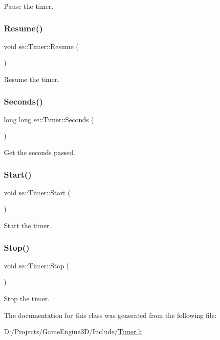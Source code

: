 Pause the timer. \mbox{\label{classse_1_1_timer_a432406f463e02336c1033d65ae1d746e}} 
\subsubsection{\texorpdfstring{Resume()}{Resume()}}
{\footnotesize\ttfamily void se\+::\+Timer\+::\+Resume (\begin{DoxyParamCaption}{ }\end{DoxyParamCaption})}

Resume the timer. \mbox{\label{classse_1_1_timer_a258761c48271338588503d8170532bde}} 
\subsubsection{\texorpdfstring{Seconds()}{Seconds()}}
{\footnotesize\ttfamily long long se\+::\+Timer\+::\+Seconds (\begin{DoxyParamCaption}{ }\end{DoxyParamCaption})}

Get the seconds passed. \mbox{\label{classse_1_1_timer_a0294f5629a28a1e169a8d1b5ab179273}} 
\subsubsection{\texorpdfstring{Start()}{Start()}}
{\footnotesize\ttfamily void se\+::\+Timer\+::\+Start (\begin{DoxyParamCaption}{ }\end{DoxyParamCaption})}

Start the timer. \mbox{\label{classse_1_1_timer_aed6b34f75ec989731c80fefe962493f3}} 
\subsubsection{\texorpdfstring{Stop()}{Stop()}}
{\footnotesize\ttfamily void se\+::\+Timer\+::\+Stop (\begin{DoxyParamCaption}{ }\end{DoxyParamCaption})}

Stop the timer. 

The documentation for this class was generated from the following file\+:\begin{DoxyCompactItemize}
\item 
D\+:/\+Projects/\+Game\+Engine3\+D/\+Include/\mbox{\hyperlink{_timer_8h}{Timer.\+h}}\end{DoxyCompactItemize}
